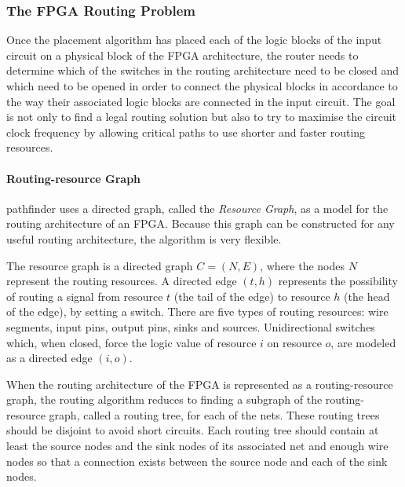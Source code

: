 \documentclass[a4paper,oneside,12pt]{article}
\begin{document}
\subsubsection{The FPGA Routing Problem}
Once the placement algorithm has placed each of the logic blocks of the input circuit on a physical block of the FPGA architecture, the router needs to determine which of the switches in the routing architecture need to be closed and which need to be opened in order to connect the physical blocks in accordance to the way their associated logic blocks are connected in the input circuit. The goal is not only to find a legal routing solution but also to try to maximise the circuit clock frequency by allowing critical paths to use shorter and faster routing resources.

\paragraph{Routing-resource Graph}
{\sc pathfinder} \cite{mcmurchie1995panprff} uses a directed graph, called the {\em Resource Graph}, as a model for the routing architecture of an FPGA.  Because this graph can be constructed for any useful routing architecture, the algorithm is very flexible. 

The resource graph is a directed graph $C=(N,E)$, where the nodes $N$ represent the routing resources. A directed edge $(t,h)$ represents the possibility of routing a signal from resource $t$ (the tail of the edge) to resource $h$ (the head of the edge), by setting a switch. There are five types of routing resources: wire segments, input pins, output pins, sinks and sources. Unidirectional switches which, when closed, force the logic value of resource $i$ on resource $o$, are modeled as a directed edge $(i,o)$.

When the routing architecture of the FPGA is represented as a routing-resource graph, the routing algorithm reduces to finding a subgraph of the routing-resource graph, called a routing tree, for each of the nets. These routing trees should be disjoint to avoid short circuits. Each routing tree should contain at least the source nodes and the sink nodes of its associated net and enough wire nodes so that a connection exists between the source node and each of the sink nodes.
\end{document}
